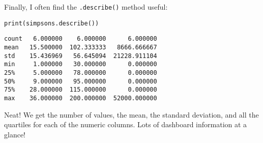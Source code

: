 Finally, I often find the \texttt{.describe()} method useful:

\begin{samepage}
\begin{Verbatim}[fontsize=\small,samepage=true,frame=single,framesep=3mm]
print(simpsons.describe())
\end{Verbatim}
\vspace{-.2in}

\begin{Verbatim}[fontsize=\small,samepage=true,frame=leftline,framesep=5mm,framerule=1mm]
count   6.000000    6.000000      6.000000
mean   15.500000  102.333333   8666.666667
std    15.436969   56.645094  21228.911104
min     1.000000   30.000000      0.000000
25%     5.000000   78.000000      0.000000
50%     9.000000   95.000000      0.000000
75%    28.000000  115.000000      0.000000
max    36.000000  200.000000  52000.000000
\end{Verbatim}
\end{samepage}


Neat! We get the number of values, the mean, the standard deviation, and all
the quartiles for each of the numeric columns. Lots of dashboard information at
a glance!



